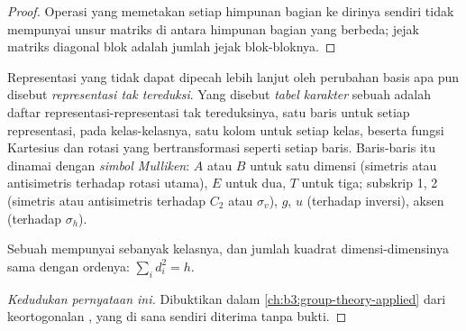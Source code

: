 \begin{proof}
Operasi yang memetakan setiap himpunan bagian ke dirinya sendiri tidak
mempunyai unsur matriks di antara himpunan bagian yang berbeda; jejak matriks
diagonal blok adalah jumlah jejak blok-bloknya.
\end{proof}

\begin{definition}\label{def:b3:point-groups:irrep}
Representasi yang tidak dapat dipecah lebih lanjut oleh perubahan basis apa
pun disebut \emph{representasi tak
tereduksi}. Yang disebut \emph{tabel karakter} sebuah
 adalah daftar  representasi-representasi tak tereduksinya,
satu baris untuk setiap representasi, pada kelas-kelasnya, satu kolom untuk
setiap kelas, beserta fungsi Kartesius dan rotasi yang bertransformasi
seperti setiap baris. Baris-baris itu dinamai dengan \emph{simbol
Mulliken}: $A$ atau $B$ untuk satu dimensi (simetris
atau antisimetris terhadap rotasi utama), $E$ untuk dua, $T$ untuk tiga;
subskrip 1, 2 (simetris atau antisimetris terhadap $C_2$ atau $\sigma_v$),
$g$, $u$ (terhadap inversi), aksen (terhadap $\sigma_h$).
\end{definition}

\begin{proposition}\label{prop:b3:point-groups:irrep-count}
Sebuah  mempunyai  sebanyak kelasnya, dan
jumlah kuadrat dimensi-dimensinya sama dengan ordenya: $\sum_id_i^2 = h$.
\end{proposition}
\begin{proof}[Kedudukan pernyataan ini]
Dibuktikan dalam \cref{ch:b3:group-theory-applied} dari keortogonalan
, yang di sana sendiri diterima tanpa bukti.
\end{proof}


